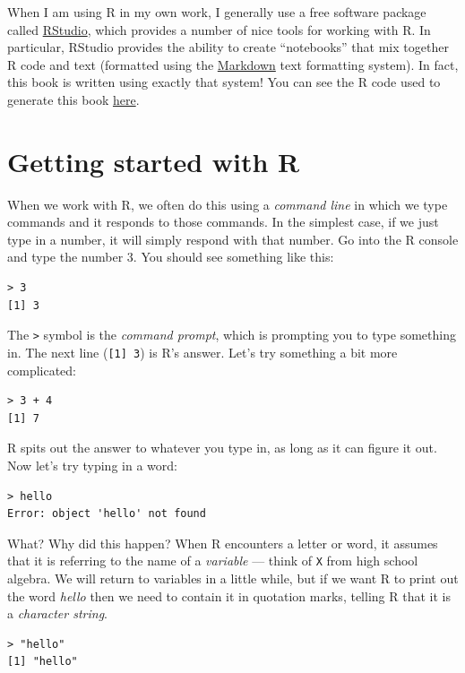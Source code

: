 \documentclass[12pt,]{book}
\begin{document}
When I am using R in my own work, I generally use a free software package called \href{https://rstudio.com/}{RStudio}, which provides a number of nice tools for working with R. In particular, RStudio provides the ability to create ``notebooks'' that mix together R code and text (formatted using the \href{https://daringfireball.net/projects/markdown/}{Markdown} text formatting system). In fact, this book is written using exactly that system! You can see the R code used to generate this book \href{https://github.com/poldrack/psych10-book}{here}.

\hypertarget{getting-started-with-r}{%
\section{Getting started with R}\label{getting-started-with-r}}

When we work with R, we often do this using a \emph{command line} in which we type commands and it responds to those commands. In the simplest case, if we just type in a number, it will simply respond with that number. Go into the R console and type the number 3. You should see something like this:

\begin{verbatim}
> 3
[1] 3
\end{verbatim}

The \texttt{\textgreater{}} symbol is the \emph{command prompt}, which is prompting you to type something in. The next line (\texttt{{[}1{]}\ 3}) is R's answer. Let's try something a bit more complicated:

\begin{verbatim}
> 3 + 4
[1] 7
\end{verbatim}

R spits out the answer to whatever you type in, as long as it can figure it out. Now let's try typing in a word:

\begin{verbatim}
> hello
Error: object 'hello' not found
\end{verbatim}

What? Why did this happen? When R encounters a letter or word, it assumes that it is referring to the name of a \emph{variable} --- think of \texttt{X} from high school algebra. We will return to variables in a little while, but if we want R to print out the word \emph{hello} then we need to contain it in quotation marks, telling R that it is a \emph{character string}.

\begin{verbatim}
> "hello"
[1] "hello"
\end{verbatim}
\end{document}

